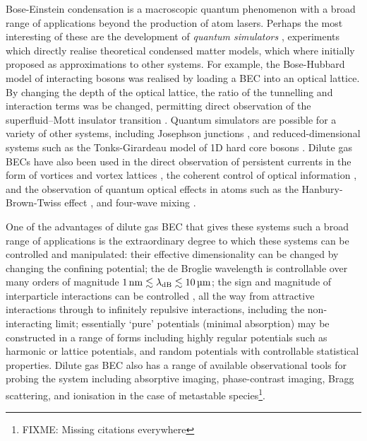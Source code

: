 Bose-Einstein condensation is a macroscopic quantum phenomenon with a broad range of applications beyond the production of atom lasers.  Perhaps the most interesting of these are the development of \emph{quantum simulators} \citep{Lewenstein:2007,Buluta:2009}, experiments which directly realise theoretical condensed matter models, which where initially proposed as approximations to other systems.  For example, the Bose-Hubbard model \citep{Fisher:1989} of interacting bosons was realised by loading a BEC into an optical lattice.  By changing the depth of the optical lattice, the ratio of the tunnelling and interaction terms was be changed, permitting direct observation of the superfluid--Mott insulator transition \citep{Greiner:2002lr}.  Quantum simulators are possible for a variety of other systems, including Josephson junctions \citep{Levy:2007vn}, and reduced-dimensional systems such as the Tonks-Girardeau model of 1D hard core bosons \citep{Girardeau:1960,Lieb:1963,Paredes:2004}.  Dilute gas BECs have also been used in the direct observation of persistent currents in the form of vortices and vortex lattices \citep{Abo-Shaeer:2001}, the coherent control of optical information \citep{Ginsberg:2007fk}, and the observation of quantum optical effects in atoms such as the Hanbury-Brown-Twiss effect \citep{Jeltes:2007fk}, and four-wave mixing \citep{Deng:1999qy}.



One of the advantages of dilute gas BEC that gives these systems such a broad range of applications is the extraordinary degree to which these systems can be controlled and manipulated:  their effective dimensionality can be changed by changing the confining potential; the de Broglie wavelength is controllable over many orders of magnitude $\unit[1]{nm} \lesssim \lambda_\text{dB} \lesssim \unit[10]{\micro m}$; the sign and magnitude of interparticle interactions can be controlled \citep{Inouye:1998hy}, all the way from attractive interactions through to infinitely repulsive interactions, including the non-interacting limit; essentially `pure' potentials (minimal absorption) may be constructed in a range of forms including highly regular potentials such as harmonic or lattice potentials, and random potentials with controllable statistical properties.  Dilute gas BEC also has a range of available observational tools for probing the system including absorptive imaging, phase-contrast imaging, Bragg scattering, and ionisation in the case of metastable species\footnote{FIXME: Missing citations everywhere}.  

